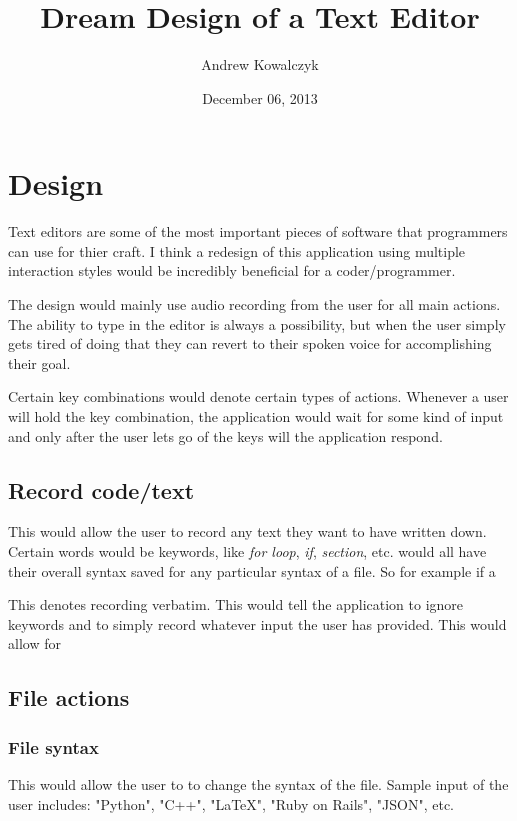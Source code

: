 \documentclass[11pt, oneside]{article}
\title{Dream Design of a Text Editor}
\author{Andrew Kowalczyk}
\date{December 06, 2013}
\begin{document}
\maketitle


\section{Design}
Text editors are some of the most important pieces of software that programmers can use for thier craft. I think a redesign of this application using multiple interaction styles would be incredibly beneficial for a coder/programmer.

The design would mainly use audio recording from the user for all main actions. The ability to type in the editor is always a possibility, but when the user simply gets tired of doing that they can revert to their spoken voice for accomplishing their goal.

Certain key combinations would denote certain types of actions. Whenever a user will hold the key combination, the application would wait for some kind of input and only after the user lets go of the keys will the application respond.

\subsection{Record code/text}
 This would allow the user to record any text they want to have written down. Certain words would be keywords, like \textit{for loop}, \textit{if}, \textit{section}, etc. would all have their overall syntax saved for any particular syntax of a file. So for example if a 

 This denotes recording verbatim. This would tell the application to ignore keywords and to simply record whatever input the user has provided. This would allow for 

\subsection{File actions}

	\subsubsection{File syntax}
	  This would allow the user to to change the syntax of the file. Sample input of the user includes: "Python", "C++", "\LaTeX", "Ruby on Rails", "JSON", etc.
\end{document}
